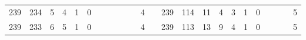 {\begin{tabular}{cccccccccccclccccccccccc}
239                                                & 234                                                & 5                                                & 4                                                & 1                                                & 0                                                &                                                 &                                                 &                                                 &                                                 &                                                 & 4                                                &                          & 239                                                & 114                                                & 11                                               & 4                                                & 3                                               & 1                                               & 0                                               &                                                 &                                                 &                                                 & 5                                                \\
239                                                & 233                                                & 6                                                & 5                                                & 1                                                & 0                                                &                                                 &                                                 &                                                 &                                                 &                                                 & 4                                                &                          & 239                                                & 113                                                & 13                                               & 9                                                & 4                                               & 1                                               & 0                                               &                                                 &                                                 &                                                 & 5                                                \\

\end{tabular}}
